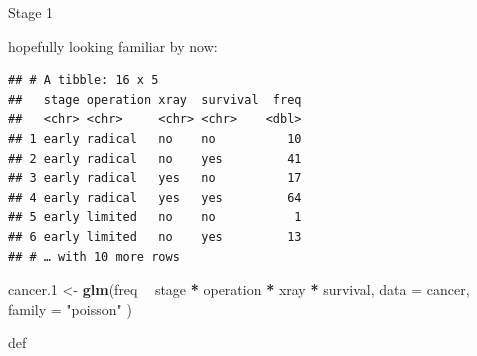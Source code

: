 \documentclass[ignorenonframetext,]{beamer}
\newenvironment{Shaded}{\begin{snugshade}}{\end{snugshade}}
\newcommand{\DataTypeTok}[1]{\textcolor[rgb]{0.13,0.29,0.53}{#1}}
\newcommand{\DecValTok}[1]{\textcolor[rgb]{0.00,0.00,0.81}{#1}}
\newcommand{\FloatTok}[1]{\textcolor[rgb]{0.00,0.00,0.81}{#1}}
\newcommand{\KeywordTok}[1]{\textcolor[rgb]{0.13,0.29,0.53}{\textbf{#1}}}
\newcommand{\NormalTok}[1]{#1}
\newcommand{\OperatorTok}[1]{\textcolor[rgb]{0.81,0.36,0.00}{\textbf{#1}}}
\newcommand{\StringTok}[1]{\textcolor[rgb]{0.31,0.60,0.02}{#1}}
\begin{document}
\begin{frame}[fragile]{Stage 1}
\protect\hypertarget{stage-1}{}

hopefully looking familiar by now:

\begin{Shaded}
\end{Shaded}

\begin{verbatim}
## # A tibble: 16 x 5
##   stage operation xray  survival  freq
##   <chr> <chr>     <chr> <chr>    <dbl>
## 1 early radical   no    no          10
## 2 early radical   no    yes         41
## 3 early radical   yes   no          17
## 4 early radical   yes   yes         64
## 5 early limited   no    no           1
## 6 early limited   no    yes         13
## # … with 10 more rows
\end{verbatim}

\begin{Shaded}
\begin{Highlighting}[]
\NormalTok{cancer}\FloatTok{.1}\NormalTok{ <-}\StringTok{ }\KeywordTok{glm}\NormalTok{(freq }\OperatorTok{~}\StringTok{ }\NormalTok{stage }\OperatorTok{*}\StringTok{ }\NormalTok{operation }\OperatorTok{*}\StringTok{ }\NormalTok{xray }\OperatorTok{*}\StringTok{ }\NormalTok{survival,}
  \DataTypeTok{data =}\NormalTok{ cancer, }\DataTypeTok{family =} \StringTok{"poisson"}
\NormalTok{)}
\end{Highlighting}
\end{Shaded}

def

\end{frame}
\end{document}
